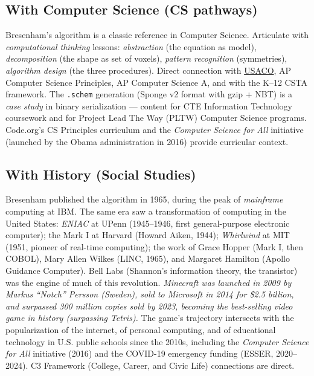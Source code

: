 \documentclass[12pt,a4paper]{scrartcl}
\begin{document}
\subsection{With Computer Science (CS pathways)}
Bresenham's algorithm is a classic reference in Computer Science. Articulate with \emph{computational thinking} lessons: \emph{abstraction} (the equation as model), \emph{decomposition} (the shape as set of voxels), \emph{pattern recognition} (symmetries), \emph{algorithm design} (the three procedures). Direct connection with \hyperref[sec:olympiad]{USACO}, AP Computer Science Principles, AP Computer Science A, and with the K--12 CSTA framework. The \texttt{.schem} generation (Sponge v2 format with gzip + NBT) is a \emph{case study} in binary serialization --- content for CTE Information Technology coursework and for Project Lead The Way (PLTW) Computer Science programs. Code.org's CS Principles curriculum and the \emph{Computer Science for All} initiative (launched by the Obama administration in 2016) provide curricular context.

\subsection{With History (Social Studies)}
Bresenham published the algorithm in 1965, during the peak of \emph{mainframe} computing at IBM. The same era saw a transformation of computing in the United States: \emph{ENIAC} at UPenn (1945--1946, first general-purpose electronic computer); the Mark I at Harvard (Howard Aiken, 1944); \emph{Whirlwind} at MIT (1951, pioneer of real-time computing); the work of Grace Hopper (Mark I, then COBOL), Mary Allen Wilkes (LINC, 1965), and Margaret Hamilton (Apollo Guidance Computer). Bell Labs (Shannon's information theory, the transistor) was the engine of much of this revolution. \emph{Minecraft was launched in 2009 by Markus \enquote{Notch} Persson (Sweden), sold to Microsoft in 2014 for \$2.5 billion, and surpassed 300 million copies sold by 2023, becoming the best-selling video game in history (surpassing Tetris).} The game's trajectory intersects with the popularization of the internet, of personal computing, and of educational technology in U.S. public schools since the 2010s, including the \emph{Computer Science for All} initiative (2016) and the COVID-19 emergency funding (ESSER, 2020--2024). C3 Framework (College, Career, and Civic Life) connections are direct.
\end{document}
